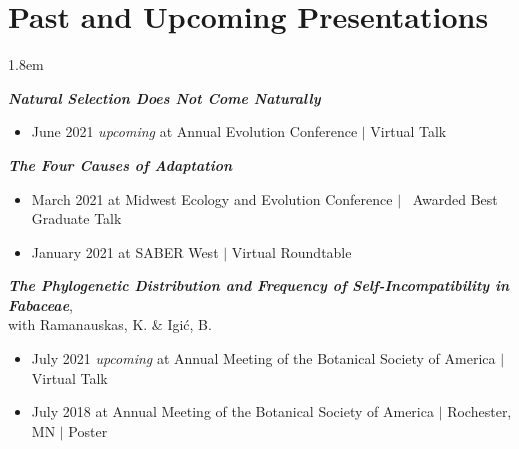 \documentclass[]{article}
\begin{document}
\section{Past and Upcoming Presentations}

\vspace{4mm}
\leftskip 1.8em

\textit{\textbf{Natural Selection Does Not Come Naturally}}

\begin{itemize}[label=$\mathwitch*$]
\item{June 2021 \textit{upcoming} at Annual Evolution Conference $\vert$ Virtual Talk 
\hspace{0.3mm} \href{https://ledelaney.org/talks/2021evolution}{\faImages} \href{https://github.com/ledelaney/06-21-Evolution}{\faGithub}}
\end{itemize}
\vspace{2mm}

\textit{\textbf{The Four Causes of Adaptation}}

\begin{itemize}[label=$\mathwitch*$]
\item{March 2021 at Midwest Ecology and Evolution Conference $\vert$ \faAward\ Awarded Best Graduate Talk  \href{https://ledelaney.org/talks/2021meec/}{\faImages} \href{https://github.com/ledelaney/03-21-MEEC}{\faGithub}}
\item{January 2021 at SABER West $\vert$ Virtual Roundtable \hspace{0.3mm} \href{https://ledelaney.org/talks/2021saberw/}{\faImages} \href{https://github.com/ledelaney/01-21-SABERwest}{\faGithub}}
\end{itemize}
\vspace{2mm}


\textit{\textbf{The Phylogenetic Distribution and Frequency of Self-Incompatibility in Fabaceae}},\\ with Ramanauskas, K. \& Igić, B.

\begin{itemize}[label=$\mathwitch*$]
\item{July 2021 \textit{upcoming} at Annual Meeting of the Botanical Society of America $\vert$ Virtual Talk}
\item{July 2018 at Annual Meeting of the Botanical Society of America $\vert$ Rochester, MN $\vert$ Poster \hspace{0.3mm} \href{https://ledelaney.org/static/posters/poster.png}{\faFileImage}}
\end{itemize}
\vspace{2mm}
\end{document}
